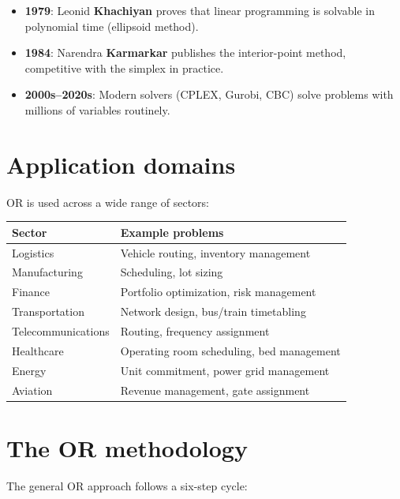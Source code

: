 \begin{itemize}
  \item \textbf{1979}: Leonid \textbf{Khachiyan} proves that linear
        programming is solvable in polynomial time (ellipsoid method).
  \item \textbf{1984}: Narendra \textbf{Karmarkar} publishes the
        interior-point method, competitive with the simplex in practice.
  \item \textbf{2000s--2020s}: Modern solvers (CPLEX, Gurobi, CBC) solve
        problems with millions of variables routinely.
\end{itemize}

\section{Application domains}

OR is used across a wide range of sectors:

\begin{center}
\renewcommand{\arraystretch}{1.2}
\begin{tabular}{ll}
  \toprule
  \textbf{Sector} & \textbf{Example problems} \\
  \midrule
  Logistics & Vehicle routing, inventory management \\
  Manufacturing & Scheduling, lot sizing \\
  Finance & Portfolio optimization, risk management \\
  Transportation & Network design, bus/train timetabling \\
  Telecommunications & Routing, frequency assignment \\
  Healthcare & Operating room scheduling, bed management \\
  Energy & Unit commitment, power grid management \\
  Aviation & Revenue management, gate assignment \\
  \bottomrule
\end{tabular}
\end{center}

\section{The OR methodology}

The general OR approach follows a six-step cycle:

